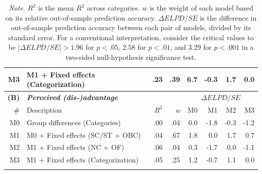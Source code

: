 \documentclass[12pt, a4paper]{article}
\begin{document}
\begin{table}
\begin{tabularx}{\linewidth}{rXrrrrrr}
M3           & M1 + Fixed effects (Categorization)         & .23                  & .39                  & {\color[HTML]{2166AC} 6.7} & {\color[HTML]{E0E0E0} -0.3} & {\color[HTML]{D1E5F0} 1.7}  & {\color[HTML]{E0E0E0} 0.0}  \\ \bottomrule \addlinespace \toprule
\textbf{(B)} & \textit{\textbf{Perceived (dis-)advantage}} & \multicolumn{1}{l}{} & \multicolumn{1}{l}{} & \multicolumn{4}{c}{$\Delta\textit{ELPD}/\textit{SE}$}                                                                                \\ \cmidrule{5-8}
\#           & Description                                 & $R^2$ & \textit{w}           & M0                         & M1                          & M2                          & M3                          \\ \midrule
M0           & Group differences (Categories)              & .00                  & .04                  & {\color[HTML]{E0E0E0} 0.0} & {\color[HTML]{FDDBC7} -1.8} & {\color[HTML]{E0E0E0} -0.3} & {\color[HTML]{E0E0E0} -1.2} \\
M1           & M0 + Fixed effects (SC/ST + OBC)            & .04                  & .67                  & {\color[HTML]{D1E5F0} 1.8} & {\color[HTML]{E0E0E0} 0.0}  & {\color[HTML]{D1E5F0} 1.7}  & {\color[HTML]{E0E0E0} 0.7}  \\
M2           & M1 + Fixed effects (NC + OF)                & .06                  & .04                  & {\color[HTML]{E0E0E0} 0.3} & {\color[HTML]{FDDBC7} -1.7} & {\color[HTML]{E0E0E0} 0.0}  & {\color[HTML]{E0E0E0} -1.1} \\
M3           & M1 + Fixed effects (Categorization)         & .05                  & .25                  & {\color[HTML]{E0E0E0} 1.2} & {\color[HTML]{E0E0E0} -0.7} & {\color[HTML]{E0E0E0} 1.1}  & {\color[HTML]{E0E0E0} 0.0} \\ \bottomrule \addlinespace
\end{tabularx}
\label{tab:t4}
\caption*{\textit{Note.} $R^2$ is the mean $R^2$ across categories. $w$ is the weight of each model based on its relative out-of-sample prediction accuracy. $\Delta\textit{ELPD}/\textit{SE}$ is the difference in out-of-sample prediction accuracy between each pair of models, divided by its standard error. For a conventional interpretation, consider the critical values to be $|\Delta\textit{ELPD}/\textit{SE}| > 1.96$ for $p < .05$, 2.58 for $p < .01$, and 3.29 for $p < .001$ in a two-sided null-hypothesis significance test.}
\end{table}
\end{document}
